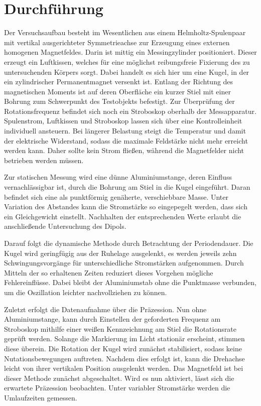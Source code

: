 \section{Durchführung}
\label{sec:durchführung}

Der Versuchsaufbau besteht im Wesentlichen aus einem Helmholtz-Spulenpaar mit vertikal ausgerichteter Symmetrieachse
zur Erzeugung eines externen homogenen Magnetfeldes. Darin ist mittig ein Messingzylinder positioniert. Dieser erzeugt
ein Luftkissen, welches für eine möglichst reibungsfreie Fixierung des zu untersuchenden Körpers sorgt. Dabei handelt
es sich hier um eine Kugel, in der ein zylindrischer Permanentmagnet versenkt ist. Entlang der Richtung des magnetischen
Moments ist auf deren Oberfläche ein kurzer Stiel mit einer Bohrung zum Schwerpunkt des Testobjekts befestigt. Zur
Überprüfung der Rotationsfrequenz befindet sich noch ein Stroboskop oberhalb der Messapparatur. Spulenstrom, Luftkissen
und Stroboskop lassen sich über eine Kontrolleinheit individuell ansteuern. Bei längerer Belastung steigt die Temperatur
und damit der elektrische Widerstand, sodass die maximale Feldstärke nicht mehr erreicht werden kann. Daher sollte
kein Strom fließen, während die Magnetfelder nicht betrieben werden müssen.

Zur statischen Messung wird eine dünne Aluminiumstange, deren Einfluss vernachlässigbar ist, durch die Bohrung am Stiel
in die Kugel eingeführt. Daran befindet sich eine als punktförmig genäherte, verschiebbare Masse. Unter Variation des
Abstandes kann die Stromstärke so eingepegelt werden, dass sich ein Gleichgewicht einstellt. Nachhalten der
entsprechenden Werte erlaubt die anschließende Untersuchung des Dipols.

Darauf folgt die dynamische Methode durch Betrachtung der Periodendauer. Die Kugel wird geringfügig aus der Ruhelage
ausgelenkt, es werden jeweils zehn Schwingungsvorgänge für unterschiedliche Stromstärken aufgenommen. Durch Mitteln
der so erhaltenen Zeiten reduziert dieses Vorgehen mögliche Fehlereinflüsse. Dabei bleibt der Aluminiumstab ohne
die Punktmasse verbunden, um die Oszillation leichter nachvollziehen zu können.

Zuletzt erfolgt die Datenaufnahme über die Präzession. Nun ohne Aluminiumstange, kann durch Einstellen der
geforderten Frequenz am Stroboskop mithilfe einer weißen Kennzeichnung am Stiel die Rotationsrate geprüft werden.
Solange die Markierung im Licht stationär erscheint, stimmen diese überein. Die Rotation der Kugel wird zunächst
stabilisiert, sodass keine Nutationsbewegungen auftreten. Nachdem dies erfolgt ist, kann die Drehachse leicht von
ihrer vertikalen Position ausgelenkt werden. Das Magnetfeld ist bei dieser Methode zunächst abgeschaltet. Wird es
nun aktiviert, lässt sich die erwartete Präzession beobachten. Unter variabler Stromstärke werden die Umlaufzeiten
gemessen.

